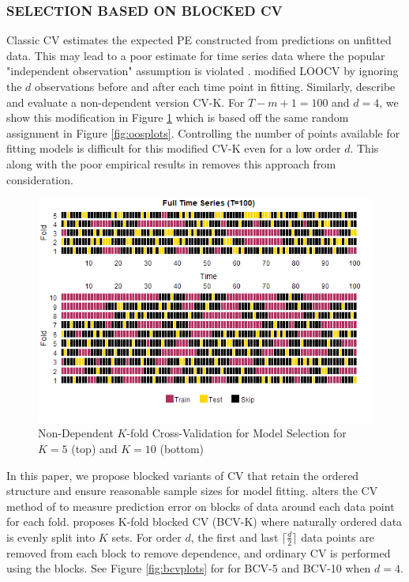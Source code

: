 \subsubsection{SELECTION BASED ON BLOCKED CV}
Classic CV estimates the expected PE constructed from predictions on unfitted data. This may lead to a poor estimate for time series data where the popular "independent observation" assumption is violated \citep{Arlot2010}. \cite{Burman1994} modified LOOCV by ignoring the $d$ observations before and after each time point in fitting. Similarly, \cite{Bergmeir2018} describe and evaluate a non-dependent version CV-K. For $T-m+1=100$ and $d=4$, we show this modification in Figure \ref{fig:depkcvplots} which is based off the same random assignment in Figure \ref{fig:oosplots}. Controlling the number of points available for fitting models is difficult for this modified CV-K even for a low order $d$. This along with the poor empirical results in \cite{Bergmeir2018} removes this approach from consideration.

\begin{figure}[htbp!]
	\caption{Non-Dependent $K$-fold Cross-Validation for Model Selection for $K=5$ (top) and $K=10$ (bottom)}
	\label{fig:depkcvplots}
	\includegraphics[scale=0.7]{depkcvplots}
\end{figure}

In this paper, we propose blocked variants of CV that retain the ordered structure and ensure reasonable sample sizes for model fitting. \cite{Racine2000} alters the CV method of \cite{Burman1994} to measure prediction error on blocks of data around each data point for each fold. \cite{Bergmeir2012} proposes K-fold blocked CV (BCV-K) where naturally ordered data is evenly split into $K$ sets.  For order $d$, the first and last $\lceil \frac{d}{2} \rceil$ data points are removed from each block to remove dependence, and ordinary CV is performed using the blocks. See Figure \ref{fig:bcvplots} for for BCV-5 and BCV-10 when $d=4$. 

